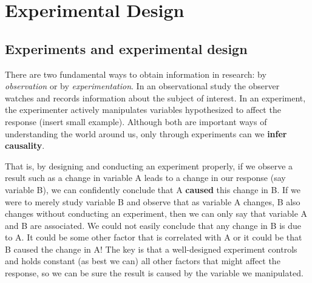 \documentclass[
  letterpaper,
]{book}
\begin{document}
\part{Experimental Design}

\chapter{Experiments and experimental
design}\label{experiments-and-experimental-design}

There are two fundamental ways to obtain information in research: by
\emph{observation} or by \emph{experimentation}. In an observational
study the observer watches and records information about the subject of
interest. In an experiment, the experimenter actively manipulates
variables hypothesized to affect the response (insert small example).
Although both are important ways of understanding the world around us,
only through experiments can we \textbf{infer causality}.

That is, by designing and conducting an experiment properly, if we
observe a result such as a change in variable A leads to a change in our
response (say variable B), we can confidently conclude that A
\textbf{caused} this change in B. If we were to merely study variable B
and observe that as variable A changes, B also changes without
conducting an experiment, then we can only say that variable A and B are
associated. We could not easily conclude that any change in B is due to
A. It could be some other factor that is correlated with A or it could
be that B caused the change in A! The key is that a well-designed
experiment controls and holds constant (as best we can) all other
factors that might affect the response, so we can be sure the result is
caused by the variable we manipulated.
\end{document}
